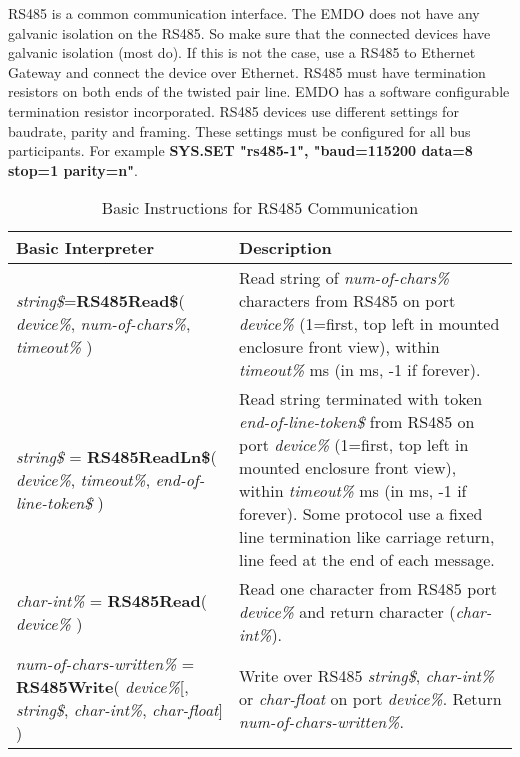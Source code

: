 RS485 is a common communication interface. The EMDO does not have any galvanic isolation on the RS485. So make sure that the connected devices have galvanic isolation (most do). If this is not the case, use a RS485 to Ethernet Gateway and connect the device over Ethernet.\newline
RS485 must have termination resistors on both ends of the twisted pair line. EMDO has a software configurable termination resistor incorporated.\newline
RS485 devices use different settings for baudrate, parity and framing. These settings must be configured for all bus participants.\newline
For example \textbf{SYS.SET "rs485-1", "baud=115200 data=8 stop=1 parity=n"}.\newline

\begin{table}[h!]
\centering
\caption{Basic Instructions for RS485 Communication}
\label{Basic_Instructions_for_RS485_Communication}
\begin{tabular}{|p{4cm}|p{10cm}|}
\hline
\textbf{Basic Interpreter} & \textbf{Description}
\\ \hline
\textit{string\$}=\textbf{RS485Read\$}( \textit{device\%}, \textit{num-of-chars\%},  \textit{timeout\%} )
& Read string of \textit{num-of-chars\%} characters from RS485 on port \textit{device\%} (1=first, top left in mounted enclosure front view), within \textit{timeout\%} ms (in ms, -1 if forever). 
\\ \hline
\textit{string\$} = \textbf{RS485ReadLn\$}( \textit{device\%}, \textit{timeout\%}, \textit{end-of-line-token\$} )
& Read string terminated with token \textit{end-of-line-token\$} from RS485 on port \textit{device\%} (1=first, top left in mounted enclosure front view), within \textit{timeout\%} ms (in ms, -1 if forever).\newline 
Some protocol use a fixed line termination like carriage return, line feed at the end of each message. 
\\ \hline
\textit{char-int\%} = \textbf{RS485Read}( \textit{device\%} )
& Read one character from RS485 port \textit{device\%} and return character (\textit{char-int\%}).
\\ \hline
\textit{num-of-chars-written\%} = \textbf{RS485Write}( \textit{device\%}[, \textit{string\$}, \textit{char-int\%}, \textit{char-float}] )
& Write over RS485 \textit{string\$}, \textit{char-int\%} or \textit{char-float} on port \textit{device\%}. Return \textit{num-of-chars-written\%}.
\\ \hline
\end{tabular}
\end{table}

